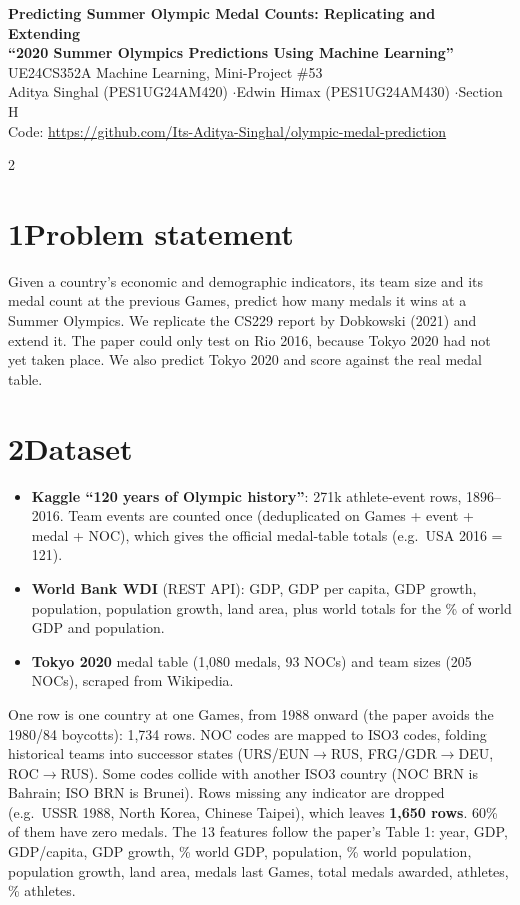 \documentclass[10pt]{article}
\begin{document}
\begin{center}
{\Large\bfseries Predicting Summer Olympic Medal Counts: Replicating and Extending\\``2020 Summer Olympics Predictions Using Machine Learning''}\\[4pt]
UE24CS352A Machine Learning, Mini-Project \#53\\
Aditya Singhal (PES1UG24AM420) \quad$\cdot$\quad Edwin Himax (PES1UG24AM430) \quad$\cdot$\quad Section H\\
Code: \url{https://github.com/Its-Aditya-Singhal/olympic-medal-prediction}
\end{center}
\vspace{-4pt}
\raggedcolumns
\begin{multicols}{2}

\section*{1\quad Problem statement}
Given a country's economic and demographic indicators, its team size and its medal count at the previous Games,
predict how many medals it wins at a Summer Olympics. We replicate the CS229 report by Dobkowski (2021)
and extend it. The paper could only test on Rio 2016, because Tokyo 2020 had not yet taken place. We also predict
Tokyo 2020 and score against the real medal table.

\section*{2\quad Dataset}
\begin{itemize}
\item \textbf{Kaggle ``120 years of Olympic history''}: 271k athlete-event rows, 1896--2016. Team events are
  counted once (deduplicated on Games + event + medal + NOC), which gives the official medal-table totals
  (e.g.\ USA 2016 = 121).
\item \textbf{World Bank WDI} (REST API): GDP, GDP per capita, GDP growth, population, population growth, land area,
  plus world totals for the \% of world GDP and population.
\item \textbf{Tokyo 2020} medal table (1,080 medals, 93 NOCs) and team sizes (205 NOCs), scraped from Wikipedia.
\end{itemize}
One row is one country at one Games, from 1988 onward (the paper avoids the 1980/84 boycotts): 1,734 rows.
NOC codes are mapped to ISO3 codes, folding historical teams into successor states
(URS/EUN$\to$RUS, FRG/GDR$\to$DEU, ROC$\to$RUS). Some codes collide with another ISO3 country
(NOC BRN is Bahrain; ISO BRN is Brunei). Rows missing any indicator are dropped (e.g.\ USSR 1988, North Korea,
Chinese Taipei), which leaves \textbf{1,650 rows}. 60\% of them have zero medals.
The 13 features follow the paper's Table 1: year, GDP, GDP/capita, GDP growth, \% world GDP, population,
\% world population, population growth, land area, medals last Games, total medals awarded, athletes, \% athletes.


\end{multicols}
\end{document}
